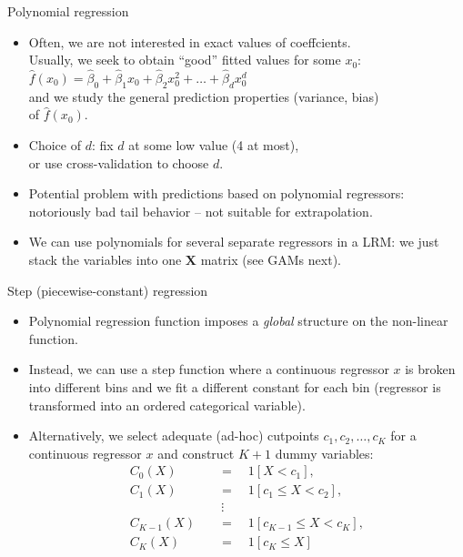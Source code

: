 \documentclass{beamer}
\begin{document}
\begin{frame}{Polynomial regression}
\begin{itemize}
    \item Often, we are not interested in exact values of coeffcients.\\
    Usually, we seek to obtain ``good'' fitted values for some $x_0$: \\ \smallskip 
    $\hat{f}(x_0) = \hat{\beta}_0 + \hat{\beta}_1 x_0 + \hat{\beta}_2 x_0^2 + \dots + \hat{\beta}_d x_0^d $\\ \smallskip 
    and we study the general  prediction properties (variance, bias) \\of  $\hat{f}(x_0)$.
    \smallskip
    \item Choice of $d$: fix $d$ at some low value (4 at most), \\or use cross-validation to choose $d$.
    \smallskip
    \item Potential problem with predictions based on polynomial regressors: notoriously bad tail behavior -- not suitable for extrapolation.
    \smallskip 
    \item We can use polynomials for several separate regressors in a LRM: we just stack the variables into one $\bm{X}$ matrix (see GAMs next).
    
\end{itemize}
\end{frame}
\begin{frame}{Step (piecewise-constant) regression}
\begin{itemize}
    \item Polynomial regression function imposes a \textit{global} structure on the non-linear function.
    \smallskip
    \item Instead, we can use a step function where a continuous regressor $x$ is broken into different bins and we fit a different constant for each bin (regressor is transformed into an ordered categorical variable).
    \smallskip
    \item Alternatively, we select adequate (ad-hoc) cutpoints $c_1, c_2, \dots, c_K$ for a continuous regressor $x$ and construct $K+1$ dummy variables:
    \begin{equation*}
       \begin{aligned}
       C_0(X) \quad &= \quad 1[X < c_1], \\
       C_1(X) \quad &= \quad 1[c_1 \leq X < c_2], \\
        &~ \vdots \\
       C_{K-1}(X) \quad &= \quad 1[c_{K-1} \leq X < c_{K}], \\
       C_K(X) \quad &= \quad 1[c_{K} \leq X] \\
        \end{aligned}    
        \end{equation*}
\end{itemize}
\end{frame}
\end{document}
